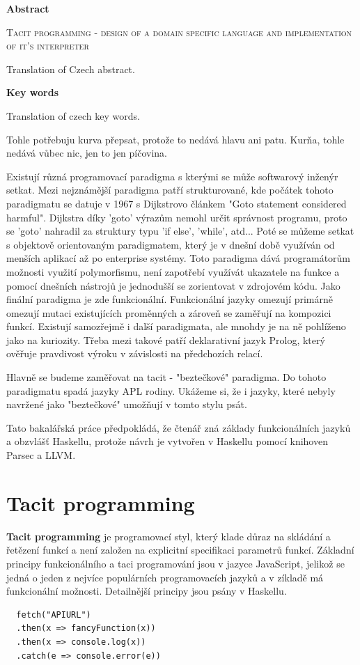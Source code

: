 \documentclass[male,czech]{kithesis}
\newcommand{\TITULen}{Tacit programming - design of a domain specific language and implementation of it's interpreter} %
\begin{document}
\textbf{\textsf{Abstract}}

\textsc{\TITULen}

Translation of Czech abstract.

\textbf{\textsf{Key words}}

Translation of czech key words.

\tableofcontents


Tohle potřebuju kurva přepsat, protože to nedává hlavu ani patu. Kurňa, tohle nedává vůbec nic, jen to jen píčovina.

Existují různá programovací paradigma s kterými se může softwarový inženýr setkat. Mezi nejznámější 
paradigma patří strukturované, kde počátek tohoto paradigmatu se datuje v 1967 s Dijkstrovo článkem 
"Goto statement considered harmful". Dijkstra díky 'goto' výrazům nemohl určit správnost programu, proto 
se 'goto' nahradil za struktury typu 'if else', 'while', atd... Poté se můžeme setkat s objektově orientovaným
paradigmatem, který je v dnešní době využíván od menších aplikací až po enterprise systémy. Toto paradigma
dává programátorům možnosti využití polymorfismu, není zapotřebí využívát ukazatele na funkce a pomocí dnešních
nástrojů je jednodušší se zorientovat v zdrojovém kódu. Jako finální paradigma je zde funkcionální. Funkcionální jazyky
omezují primárně omezují mutaci existujících proměnných a zároveň se zaměřují na kompozici funkcí.
Existují samozřejmě i další paradigmata, ale mnohdy je na ně pohlíženo jako na kuriozity. Třeba 
mezi takové patří deklarativní jazyk Prolog, který ověřuje pravdivost výroku v závislosti na předchozích
relací.

Hlavně se budeme zaměřovat na tacit - "beztečkové" paradigma. Do tohoto paradigmatu spadá 
jazyky APL rodiny. Ukážeme si, že i jazyky, které nebyly navržené jako "beztečkové" umožňují v tomto stylu psát.

Tato bakalářská práce předpokládá, že čtenář zná základy funkcionálních jazyků a obzvlášť Haskellu, 
protože návrh je vytvořen v Haskellu pomocí knihoven Parsec a LLVM.

\chapter{Tacit programming}
\textbf{Tacit programming} je programovací styl, 
který klade důraz na skládání a řetězení funkcí a není založen na explicitní specifikaci parametrů funkcí.
Základní principy funkcionálního a taci programování jsou v jazyce JavaScript, 
jelikož se jedná o jeden z nejvíce populárních programovacích jazyků a v zíkladě má funkcionální možnosti. 
Detailnější principy jsou psány v Haskellu.
\begin{verbatim}
  fetch("APIURL")
  .then(x => fancyFunction(x))
  .then(x => console.log(x))
  .catch(e => console.error(e))
\end{verbatim}
\end{document}
